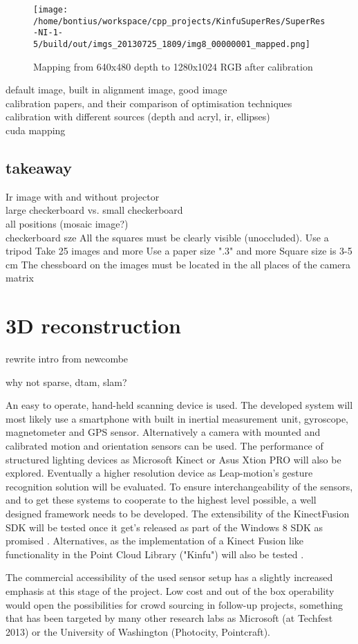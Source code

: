 \documentclass{ucl_thesis}
\begin{document}
\begin{figure}[h!]\centering
        \texttt{[image: /home/bontius/workspace/cpp\_projects/KinfuSuperRes/SuperRes-NI-1-5/build/out/imgs\_20130725\_1809/img8\_00000001\_mapped.png]}
        \caption{Mapping from 640x480 depth to 1280x1024 RGB after calibration}
\end{figure}


default image, built in alignment image, good image\\
calibration papers, and their comparison of optimisation techniques\\
calibration with different sources (depth and acryl, ir, ellipses)\\
cuda mapping\\


\subsection{takeaway}
Ir image with and without projector\\
large checkerboard vs. small checkerboard\\
all positions (mosaic image?)\\
checkerboard sze 
All the squares must be clearly visible (unoccluded).
Use a tripod
Take 25 images and more
Use a paper size ".3" and more
Square size is 3-5 cm
The chessboard on the images must be located in the all places of the camera matrix

\section{3D reconstruction}


rewrite intro from newcombe

why not sparse, dtam, slam?
\par An easy to operate, hand-held scanning device is used. The developed system will most likely use a smartphone with built in inertial measurement unit, gyroscope, magnetometer and GPS sensor. Alternatively a camera with mounted and calibrated motion and orientation sensors can be used. The performance of structured lighting devices as Microsoft Kinect \cite{Kinect} or Asus Xtion PRO \cite{XtionPro} will also be explored. Eventually a higher resolution device as Leap-motion's gesture recognition solution \cite{LeapMotion} will be evaluated. To ensure interchangeability of the sensors, and to get these systems to cooperate to the highest level possible, a well designed framework needs to be developed. The extensibility of the KinectFusion SDK will be tested once it get's released as part of the Windows 8 SDK as promised \cite{SDKKinectFusion}. Alternatives, as the implementation of a Kinect Fusion like functionality in the Point Cloud Library ("Kinfu") will also be tested \cite{KinFu}.
\par The commercial accessibility of the used sensor setup has a slightly increased emphasis at this stage of the project. Low cost and out of the box operability would open the possibilities for crowd sourcing in follow-up projects, something that has been targeted by many other research labs as Microsoft (at Techfest 2013) or the University of Washington (Photocity, Pointcraft).
\end{document}
